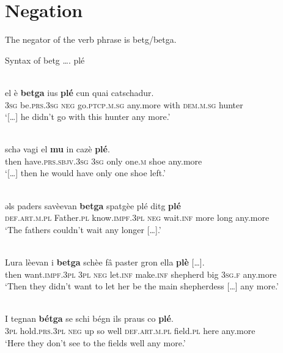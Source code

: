 \section{Negation}
The negator of the verb phrase is betg/betga.

Syntax of betg …. plé

\ea\label{}
 {\citealt[12]{Büchli1966}}\\
\gll   el è \textbf{betga} ius \textbf{plé} cun quai catschadur. \\
      \textsc{3sg} be.\textsc{prs.3sg} \textsc{neg} go.\textsc{ptcp.m.sg} any.more with \textsc{dem.m.sg} hunter\\
\glt `[…] he didn’t go with this hunter any more.'
\z

\ea\label{}
 {\citealt[15]{Büchli1966}}\\
\gll  schǝ vagi el \textbf{mu} in cazè \textbf{plé}.\\
     then have.\textsc{prs.sbjv.3sg} \textsc{3sg} only one.\textsc{m} shoe any.more \\
\glt `[…] then he would have only one shoe left.'
\z

\ea\label{}
 {\citealt[147]{Büchli1966}}\\
\gll    ǝls paders savèevan \textbf{betga} spatgèe plé ditg \textbf{plé}\\
      \textsc{def.art.m.pl} Father.\textsc{pl} know.\textsc{impf.3pl} \textsc{neg} wait.\textsc{inf} more long any.more\\
\glt `The fathers couldn’t wait any longer […].'
\z

\ea\label{}
 {\citealt[119]{Büchli1966}}\\
\gll    Lura lèevan  i \textbf{betga} schèe fâ paster gron ella \textbf{plè} […].\\
     then want.\textsc{impf.3pl} \textsc{3pl} \textsc{neg} let.\textsc{inf} make.\textsc{inf} shepherd big \textsc{3sg.f} any.more\\
\glt `Then they didn’t want to let her be the main shepherdess […] any more.'
\z

\ea\label{ex:}
\\
\gll   I tegnan \textbf{bétga} se schi bégn ils praus co \textbf{plé}. \\
     \textsc{3pl} hold.\textsc{prs.3pl} \textsc{neg} up so well \textsc{def.art.m.pl} field.\textsc{pl} here any.more \\
\glt `Here they don’t see to the fields well any more.'
\z

